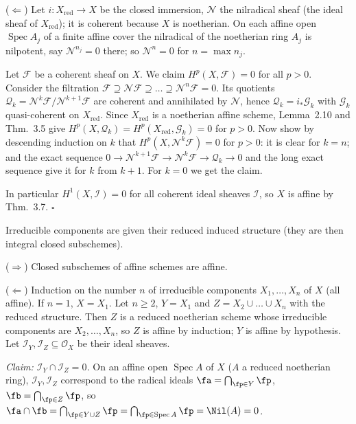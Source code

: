 \documentclass[11pt]{article}
\begin{document}
($\Leftarrow$) Let $i:X_{\mathrm{red}}\to X$ be the closed immersion, $\mathcal N$ the nilradical sheaf (the ideal sheaf of $X_{\mathrm{red}}$); it is coherent because $X$ is noetherian. On each affine open $\operatorname{Spec}A_j$ of a finite affine cover the nilradical of the noetherian ring $A_j$ is nilpotent, say $\mathcal N^{n_j}=0$ there; so $\mathcal N^n=0$ for $n=\max n_j$.

Let $\mathcal F$ be a coherent sheaf on $X$. We claim $H^p(X,\mathcal F)=0$ for all $p>0$. Consider the filtration $\mathcal F\supseteq\mathcal N\mathcal F\supseteq\dots\supseteq\mathcal N^n\mathcal F=0$. Its quotients $\mathcal Q_k=\mathcal N^k\mathcal F/\mathcal N^{k+1}\mathcal F$ are coherent and annihilated by $\mathcal N$, hence $\mathcal Q_k=i_*\mathcal G_k$ with $\mathcal G_k$ quasi-coherent on $X_{\mathrm{red}}$. Since $X_{\mathrm{red}}$ is a noetherian affine scheme, Lemma~2.10 and Thm.~3.5 give $H^p(X,\mathcal Q_k)=H^p(X_{\mathrm{red}},\mathcal G_k)=0$ for $p>0$. Now show by descending induction on $k$ that $H^p(X,\mathcal N^k\mathcal F)=0$ for $p>0$: it is clear for $k=n$; and the exact sequence $0\to\mathcal N^{k+1}\mathcal F\to\mathcal N^k\mathcal F\to\mathcal Q_k\to0$ and the long exact sequence give it for $k$ from $k+1$. For $k=0$ we get the claim.

In particular $H^1(X,\mathcal I)=0$ for all coherent ideal sheaves $\mathcal I$, so $X$ is affine by Thm.~3.7. \hfill$\square$

\pf
Irreducible components are given their reduced induced structure (they are then integral closed subschemes).

($\Rightarrow$) Closed subschemes of affine schemes are affine.

($\Leftarrow$) Induction on the number $n$ of irreducible components $X_1,\dots,X_n$ of $X$ (all affine). If $n=1$, $X=X_1$. Let $n\ge2$, $Y=X_1$ and $Z=X_2\cup\dots\cup X_n$ with the reduced structure. Then $Z$ is a reduced noetherian scheme whose irreducible components are $X_2,\dots,X_n$, so $Z$ is affine by induction; $Y$ is affine by hypothesis. Let $\mathcal I_Y,\mathcal I_Z\subseteq\mathcal O_X$ be their ideal sheaves.

\emph{Claim: $\mathcal I_Y\cap\mathcal I_Z=0$.} On an affine open $\operatorname{Spec}A$ of $X$ ($A$ a reduced noetherian ring), $\mathcal I_Y,\mathcal I_Z$ correspond to the radical ideals $\fa=\bigcap_{\fp\in Y}\fp$, $\fb=\bigcap_{\fp\in Z}\fp$, so $\fa\cap\fb=\bigcap_{\fp\in Y\cup Z}\fp=\bigcap_{\fp\in\operatorname{Spec}A}\fp=\Nil(A)=0$.
\end{document}
